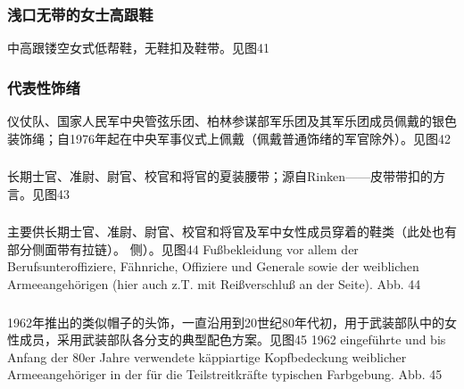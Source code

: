 \subsubsection*{浅口无带的女士高跟鞋}%

中高跟镂空女式低帮鞋，无鞋扣及鞋带。见图41

\subsubsection*{代表性饰绪}%

仪仗队、国家人民军中央管弦乐团、柏林参谋部军乐团及其军乐团成员佩戴的银色装饰绳；自1976年起在中央军事仪式上佩戴（佩戴普通饰绪的军官除外）。见图42

\subsubsection*{}%

长期士官、准尉、尉官、校官和将官的夏装腰带；源自Rinken——皮带带扣的方言。见图43

\subsubsection*{}%

主要供长期士官、准尉、尉官、校官和将官及军中女性成员穿着的鞋类（此处也有部分侧面带有拉链）。
侧）。见图44
Fußbekleidung vor allem der Berufsunteroffiziere, Fähnriche, Offiziere und Generale sowie der weiblichen Armeeangehörigen (hier auch z.T. mit Reißverschluß an der
Seite). Abb. 44

\subsubsection*{}%

1962年推出的类似帽子的头饰，一直沿用到20世纪80年代初，用于武装部队中的女性成员，采用武装部队各分支的典型配色方案。见图45
1962 eingeführte und bis Anfang der 80er Jahre verwendete käppiartige Kopfbedeckung weiblicher Armeeangehöriger in der für die Teilstreitkräfte typischen Farbgebung. Abb. 45


